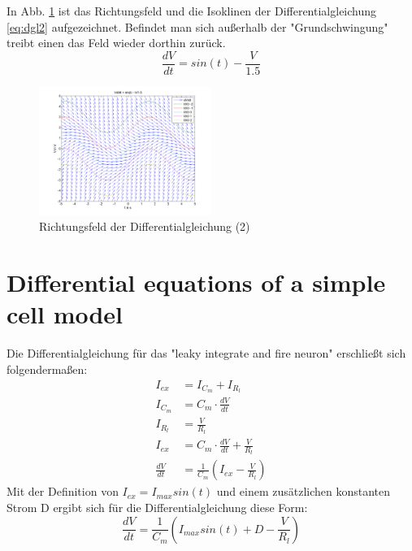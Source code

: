 \documentclass[conference]{IEEEtran}
\begin{document}
In Abb. \ref{fig:fkt2} ist das Richtungsfeld und die Isoklinen der Differentialgleichung \eqref{eq:dgl2} aufgezeichnet. Befindet man sich außerhalb der "Grundschwingung" treibt einen das Feld wieder dorthin zurück.
\begin{equation}
	\frac{dV}{dt} = sin(t) - \frac{V}{1.5}
	\label{eq:dgl2}
\end{equation}
\begin{figure}
	\centering
	\includegraphics[width=0.5\textwidth]{img/fkt2.png}
	\caption{Richtungsfeld der Differentialgleichung (2)}
	\label{fig:fkt2}
\end{figure}

\section{Differential equations of a simple cell model}
Die Differentialgleichung für das "leaky integrate and fire neuron" erschließt sich folgendermaßen:
\begin{align}
I_{ex}  & = I_{C_m} + I_{R_l}\\
I_{C_m} & = C_m \cdot \frac{dV}{dt}\\
I_{R_l} & = \frac{V}{R_l}\\
I_{ex}  & = C_m \cdot \frac{dV}{dt} + \frac{V}{R_l}\\
\frac{dV}{dt} & = \frac{1}{C_m}(I_{ex} - \frac{V}{R_l})
\label{dgl}
\end{align}
Mit der Definition von $I_{ex} = I_{max} sin(t)$ und einem zusätzlichen konstanten Strom D ergibt sich für die Differentialgleichung diese Form:
\begin{equation}
	\frac{dV}{dt} = \frac{1}{C_m}(I_{max} sin(t) + D - \frac{V}{R_l})
\end{equation}
\end{document}
